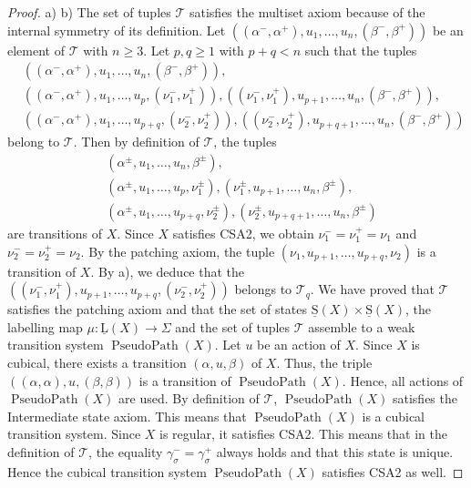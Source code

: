 \documentclass[a4paper,12pt]{amsart}
\begin{document}
\begin{proof} {a)}
{b)} The set of tuples $\mathcal{T}$ satisfies the multiset axiom
because of the internal symmetry of its definition. Let
$((\alpha^-,\alpha^+),u_1,\dots,u_n,(\beta^-,\beta^+))$ be an element
of $\mathcal{T}$ with $n{\geqslant} 3$. Let $p,q{\geqslant} 1$ with $p+q<n$ such that the
tuples
\begin{align*}
 &((\alpha^-,\alpha^+),u_1, \dots, u_n, (\beta^-,\beta^+)), \\ &((\alpha^-,\alpha^+),u_1, \dots, u_p,
  (\nu_1^-,\nu_1^+)), ((\nu_1^-,\nu_1^+), u_{p+1}, \dots, u_n, (\beta^-,\beta^+)),\\ &((\alpha^-,\alpha^+), u_1,
  \dots, u_{p+q}, (\nu_2^-,\nu_2^+)), ((\nu_2^-,\nu_2^+), u_{p+q+1}, \dots, u_n, (\beta^-,\beta^+))
\end{align*}
belong to $\mathcal{T}$. Then by definition of $\mathcal{T}$, the tuples 
\begin{align*}
 &(\alpha^\pm,u_1, \dots, u_n, \beta^\pm), \\ &(\alpha^\pm,u_1, \dots, u_p,
  \nu_1^\pm), (\nu_1^\pm, u_{p+1}, \dots, u_n, \beta^\pm),\\ &(\alpha^\pm, u_1,
  \dots, u_{p+q}, \nu_2^\pm), (\nu_2^\pm, u_{p+q+1}, \dots, u_n, \beta^\pm)
\end{align*}
are transitions of $X$. Since $X$ satisfies CSA2, we obtain
$\nu_1^-=\nu_1^+=\nu_1$ and $\nu_2^-=\nu_2^+=\nu_2$.  By the patching
axiom, the tuple $(\nu_1, u_{p+1}, \dots, u_{p+q}, \nu_2)$ is a
transition of $X$. By a), we deduce that the $((\nu_1^-,\nu_1^+),
u_{p+1}, \dots, u_{p+q}, (\nu_2^-,\nu_2^+))$ belongs to
$\mathcal{T}_{q}$. We have proved that $\mathcal{T}$ satisfies the
patching axiom and that the set of states $\operatorname{\underline{S}}(X)\times \operatorname{\underline{S}}(X)$, the
labelling map $\mu:\operatorname{\underline{L}}(X)\to \Sigma$ and the set of tuples
$\mathcal{T}$ assemble to a weak transition system $\operatorname{{PseudoPath}}(X)$. Let
$u$ be an action of $X$. Since $X$ is cubical, there exists a
transition $(\alpha,u,\beta)$ of $X$. Thus, the triple
$((\alpha,\alpha),u,(\beta,\beta))$ is a transition of
$\operatorname{{PseudoPath}}(X)$. Hence, all actions of $\operatorname{{PseudoPath}}(X)$ are used.  By
definition of $\mathcal{T}$, $\operatorname{{PseudoPath}}(X)$ satisfies the Intermediate
state axiom. This means that $\operatorname{{PseudoPath}}(X)$ is a cubical transition
system. Since $X$ is regular, it satisfies CSA2.  This means that in
the definition of $\mathcal{T}$, the equality
$\gamma_\sigma^-=\gamma_\sigma^+$ always holds and that this state is
unique. Hence the cubical transition system $\operatorname{{PseudoPath}}(X)$ satisfies
CSA2 as well.  \end{proof}
\end{document}
